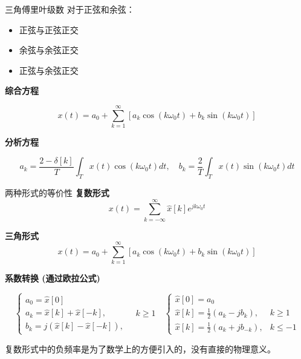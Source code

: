 \documentclass[
  ignorenonframetext,
]{beamer}
\begin{document}
\begin{frame}{三角傅里叶级数}
\protect{}\label{ux4e09ux89d2ux5085ux91ccux53f6ux7ea7ux6570}
对于正弦和余弦：

\begin{itemize}
\item
  正弦与正弦正交
\item
  余弦与余弦正交
\item
  正弦与余弦正交
\end{itemize}

\textbf{综合方程}

\[
x(t)=a_{0}+\sum_{k=1}^{\infty}\left[a_{k} \cos \left(k \omega_{0} t\right)+b_{k} \sin \left(k \omega_{0} t\right)\right]
\]

\textbf{分析方程}

\[
a_{k}=\frac{2-\delta[k]}{T} \int_{T} x(t) \cos \left(k \omega_{0} t\right) d t, \quad b_{k}=\frac{2}{T} \int_{T} x(t) \sin \left(k \omega_{0} t\right) d t
\]
\end{frame}

\begin{frame}{两种形式的等价性}
\protect{}\label{ux4e24ux79cdux5f62ux5f0fux7684ux7b49ux4ef7ux6027}
\textbf{复数形式} \[
x(t)=\sum_{k=-\infty}^{\infty} \hat{x}[k] e^{j k \omega_{0} t}
\]

\textbf{三角形式} \[
x(t)=a_{0}+\sum_{k=1}^{\infty}\left[a_{k} \cos \left(k \omega_{0} t\right)+b_{k} \sin \left(k \omega_{0} t\right)\right]
\]

\textbf{系数转换 (通过欧拉公式)}

\[
\left\{\begin{array}{ll}
a_{0}=\hat{x}[0] \\
a_{k}=\hat{x}[k]+\hat{x}[-k], \\
b_{k}=j(\hat{x}[k]-\hat{x}[-k]),
\end{array} \quad k \geq 1 \quad  \begin{cases}\hat{x}[0]=a_{0} \\
\hat{x}[k]=\frac{1}{2}\left(a_{k}-j b_{k}\right), & k \geq 1 \\
\hat{x}[k]=\frac{1}{2}\left(a_{k}+j b_{-k}\right), & k \leq-1\end{cases}\right.
\]

复数形式中的负频率是为了数学上的方便引入的，没有直接的物理意义。
\end{frame}
\end{document}
